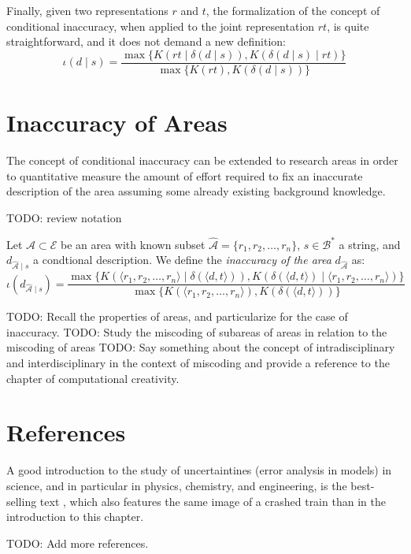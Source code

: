 Finally, given two representations $r$ and $t$, the formalization of the concept of conditional inaccuracy, when applied to the joint representation $rt$, is quite straightforward, and it does not demand a new definition:
\[
\iota(d \mid s) = \frac{ \max\{ K \left(rt \mid \delta(d \mid s) \right), K \left( \delta(d \mid s) \mid rt \right) \} } { \max\{ K(rt), K \left(\delta(d \mid s) \right) \} }
\]

%
%

\section{Inaccuracy of Areas}

The concept of conditional inaccuracy can be extended to research areas in order to quantitative measure the amount of effort required to fix an inaccurate description of the area assuming some already existing background knowledge.

{\color{red} TODO: review notation}

\begin{definition}
Let $\mathcal{A} \subset \mathcal{E}$ be an area with known subset $\hat{\mathcal{A}} = \{r_1, r_2, \ldots, r_n\}$, $s \in \mathcal{B}^\ast$ a string, and $d_{\hat{\mathcal{A}} \mid s}$ a condtional description. We define the \emph{inaccuracy of the area} $d_{\hat{\mathcal{A}}}$ as:
\[
\iota(d_{\hat{\mathcal{A}} \mid s}) = \frac{ \max\{ K \left( \langle r_1, r_2, \ldots, r_n \rangle \mid \delta(\langle d, t \rangle) \right), K \left( \delta(\langle d, t \rangle) \mid \langle r_1, r_2, \ldots, r_n \rangle \right) \} } { \max\{ K(\langle r_1, r_2, \ldots, r_n \rangle), K \left(\delta(\langle d, t \rangle) \right) \} }
\]
\end{definition}

{\color{red}

TODO: Recall the properties of areas, and particularize for the case of inaccuracy.
TODO: Study the miscoding of subareas of areas in relation to the miscoding of areas
TODO: Say something about the concept of intradisciplinary and interdisciplinary in the context
of miscoding and provide a reference to the chapter of computational creativity.

}

%
%

\section*{References}

A good introduction to the study of uncertaintines (error analysis in models) in science, and in particular in physics, chemistry, and engineering, is the best-selling text \cite{taylor2022introduction}, which also features the same image of a crashed train than in the introduction to this chapter.

{\color{red} TODO: Add more references.}


